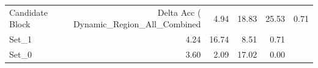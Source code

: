 \begin{tabular}{lrrrr}
\toprule
Candidate Block & Delta Acc (%
\midrule
Dynamic_Region_All_Combined & 4.94 & 18.83 & 25.53 & 0.71 \\
Set_1 & 4.24 & 16.74 & 8.51 & 0.71 \\
Set_0 & 3.60 & 2.09 & 17.02 & 0.00 \\
\bottomrule
\end{tabular}

